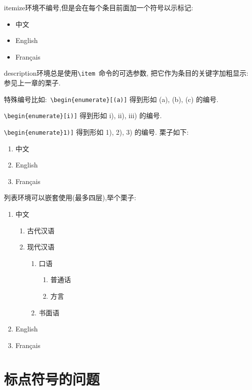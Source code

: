 \documentclass[forprint]{YAUthesis}
\begin{document}
itemize环境不编号,但是会在每个条目前面加一个符号以示标记: 

\begin{itemize}
  \item 中文
  \item English
  \item Français
\end{itemize}

description环境总是使用\verb|\item |命令的可选参数, 把它作为条目的关键字加粗显示:
参见上一章的栗子.

特殊编号比如:~\verb|\begin{enumerate}[(a)]| 得到形如 (a), (b), (c) 的编号.

\verb|\begin{enumerate}[i)]| 得到形如 i), ii), iii) 的编号.

\verb|\begin{enumerate}1)]| 得到形如 1), 2), 3) 的编号. 栗子如下: 

\begin{enumerate}[1)]
  \item 中文
  \item English
  \item Français
\end{enumerate}


列表环境可以嵌套使用(最多四层),举个栗子: 

\begin{enumerate}
  \item 中文
  \begin{enumerate}
    \item 古代汉语
    \item 现代汉语
    \begin{enumerate}
      \item 口语
      \begin{enumerate}
        \item 普通话
        \item 方言
      \end{enumerate}
      \item 书面语
    \end{enumerate}
  \end{enumerate}
  \item English
  \item Français
\end{enumerate}

\section{标点符号的问题}
\end{document}
